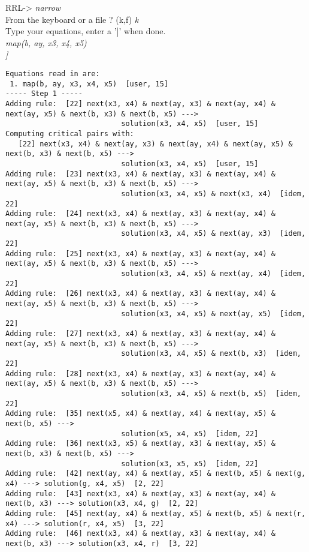 RRL-> {\em narrow} \\
From the keyboard or a file ? (k,f) {\em k}\\
Type your equations, enter a ']' when done.\\
{\em map(b, ay, x3, x4, x5)\\
]}
\begin{verbatim}
Equations read in are:
 1. map(b, ay, x3, x4, x5)  [user, 15]
----- Step 1 -----
Adding rule:  [22] next(x3, x4) & next(ay, x3) & next(ay, x4) & next(ay, x5) & next(b, x3) & next(b, x5) ---> 
                           solution(x3, x4, x5)  [user, 15]
Computing critical pairs with: 
   [22] next(x3, x4) & next(ay, x3) & next(ay, x4) & next(ay, x5) & next(b, x3) & next(b, x5) --->
                           solution(x3, x4, x5)  [user, 15]
Adding rule:  [23] next(x3, x4) & next(ay, x3) & next(ay, x4) & next(ay, x5) & next(b, x3) & next(b, x5) --->
                           solution(x3, x4, x5) & next(x3, x4)  [idem, 22]
Adding rule:  [24] next(x3, x4) & next(ay, x3) & next(ay, x4) & next(ay, x5) & next(b, x3) & next(b, x5) --->
                           solution(x3, x4, x5) & next(ay, x3)  [idem, 22]
Adding rule:  [25] next(x3, x4) & next(ay, x3) & next(ay, x4) & next(ay, x5) & next(b, x3) & next(b, x5) --->
                           solution(x3, x4, x5) & next(ay, x4)  [idem, 22]
Adding rule:  [26] next(x3, x4) & next(ay, x3) & next(ay, x4) & next(ay, x5) & next(b, x3) & next(b, x5) --->
                           solution(x3, x4, x5) & next(ay, x5)  [idem, 22]
Adding rule:  [27] next(x3, x4) & next(ay, x3) & next(ay, x4) & next(ay, x5) & next(b, x3) & next(b, x5) --->
                           solution(x3, x4, x5) & next(b, x3)  [idem, 22]
Adding rule:  [28] next(x3, x4) & next(ay, x3) & next(ay, x4) & next(ay, x5) & next(b, x3) & next(b, x5) --->
                           solution(x3, x4, x5) & next(b, x5)  [idem, 22]
Adding rule:  [35] next(x5, x4) & next(ay, x4) & next(ay, x5) & next(b, x5) --->
                           solution(x5, x4, x5)  [idem, 22]
Adding rule:  [36] next(x3, x5) & next(ay, x3) & next(ay, x5) & next(b, x3) & next(b, x5) --->
                           solution(x3, x5, x5)  [idem, 22]
Adding rule:  [42] next(ay, x4) & next(ay, x5) & next(b, x5) & next(g, x4) ---> solution(g, x4, x5)  [2, 22]
Adding rule:  [43] next(x3, x4) & next(ay, x3) & next(ay, x4) & next(b, x3) ---> solution(x3, x4, g)  [2, 22]
Adding rule:  [45] next(ay, x4) & next(ay, x5) & next(b, x5) & next(r, x4) ---> solution(r, x4, x5)  [3, 22]
Adding rule:  [46] next(x3, x4) & next(ay, x3) & next(ay, x4) & next(b, x3) ---> solution(x3, x4, r)  [3, 22]

\end{verbatim}
